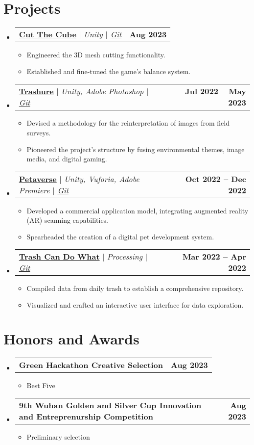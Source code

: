 \documentclass[letterpaper,11pt]{article}
\makeatletter
\newcommand{\resumeItem}[1]{
    \item\small{
            {#1 \vspace{-2pt}}
    }
}
\newcommand{\resumeProjectHeading}[2]{
    \item
    \begin{tabular*}{1.001\textwidth}{l@{\extracolsep{\fill}}r}
    \small#1 & \textbf{\small #2}\\
    \end{tabular*}\vspace{-7pt}
}
\newcommand{\resumeSubHeadingListStart}{\begin{itemize}[leftmargin=0.0in, label={}]}
\newcommand{\resumeSubHeadingListEnd}{\end{itemize}}
\newcommand{\resumeItemListStart}{\begin{itemize}}
\newcommand{\resumeItemListEnd}{\end{itemize}\vspace{-5pt}}
\makeatother
\begin{document}
\section{Projects}
\vspace{-6pt}
\resumeSubHeadingListStart
\resumeProjectHeading
{\textbf{\href{https://dadavidtseng.info/gamedev0003_cutthecube/}{Cut The Cube}} $|$ \emph{Unity $|$
\href{https://github.com/dadavidtseng/CutTheCube}{Git}}}{Aug 2023}
\resumeItemListStart
\resumeItem{ Engineered the 3D mesh cutting functionality.}
\resumeItem{ Established and fine-tuned the game's balance system.}
\resumeItemListEnd

\vspace{-12pt}

\resumeProjectHeading
{\textbf{\href{https://dadavidtseng.info/gamedev0002_trashure/}{Trashure}} $|$ \emph{Unity, Adobe Photoshop $|$ \href{https://github.com/dadavidtseng/Trashure_V3}{Git}}}{Jul 2022 -- May 2023}
\resumeItemListStart
\resumeItem{ Devised a methodology for the reinterpretation of images from field surveys.}
\resumeItem{ Pioneered the project's structure by fusing environmental themes, image media, and digital gaming.}
\resumeItemListEnd

\vspace{-12pt}

\resumeProjectHeading
{\textbf{\href{https://dadavidtseng.info/gamedev0001_petaverse/}{Petaverse}} $|$ \emph{Unity, Vuforia, Adobe Premiere $|$ \href{https://github.com/dadavidtseng/Petaverse}{Git}}}
{Oct 2022 -- Dec 2022}
\resumeItemListStart
\resumeItem{ Developed a commercial application model, integrating augmented reality (AR) scanning capabilities.}
\resumeItem{ Spearheaded the creation of a digital pet development system.}
\resumeItemListEnd

\vspace{-12pt}

\resumeProjectHeading
{\textbf{\href{https://dadavidtseng.info/architecture0003_trashcandowhat/}{Trash Can Do What}} $|$ \emph{Processing $|$ \href{https://github.com/dadavidtseng/TrashCanDoWhat}{Git}}}{Mar 2022 -- Apr 2022}
\resumeItemListStart
\resumeItem{ Compiled data from daily trash to establish a comprehensive repository.}
\resumeItem{ Visualized and crafted an interactive user interface for data exploration.}
\resumeItemListEnd

\resumeSubHeadingListEnd

\section{Honors and Awards}
\vspace{-6pt}
\resumeSubHeadingListStart
\resumeProjectHeading
{\textbf{Green Hackathon Creative Selection}}{Aug 2023}
\resumeItemListStart
\resumeItem{Best Five}
\resumeItemListEnd
\vspace{-12pt}
\resumeProjectHeading
{\textbf{9th Wuhan Golden and Silver Cup Innovation and Entreprenurship Competition}}{Aug 2023}
\resumeItemListStart
\resumeItem{Preliminary selection}
\resumeItemListEnd
\resumeSubHeadingListEnd
\end{document}
